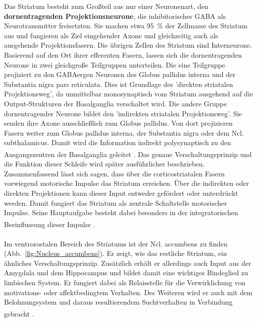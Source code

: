 \documentclass[12pt,a4paper,pdftex]{article}
\begin{document}
Das Striatum besteht zum Großteil aus nur einer Neuronenart, den \textbf{dornentragenden Projektionsneurone}, die inhibitorisches GABA als Neurotransmitter freisetzten. Sie machen etwa 95~\% der Zellmasse des Striatum aus und fungieren als Ziel eingehender Axone und gleichzeitig auch als ausgehende Projektionsfasern. Die übrigen Zellen des Striatum sind Interneurone. Basierend auf den Ort ihrer efferenten Fasern, lassen sich die dornentragenden Neurone in zwei gleichgroße Teilgruppen unterteilen. Die eine Teilgruppe projiziert zu den GABAergen Neuronen des Globus pallidus interna und der Substantia nigra pars reticulata. Dies ist Grundlage des 'direkten striatalen Projektionsweg', da unmittelbar monosynaptisch vom Striatum ausgehend auf die Output-Strukturen der Basalganglia verschaltet wird. Die andere Gruppe dornentragender Neurone bildet den 'indirekten striatalen Projektionsweg'. Sie senden ihre Axone ausschließlich zum Globus pallidus. Von dort projizieren Fasern weiter zum Globus pallidus interna, der Substantia nigra oder dem Ncl. subthalamicus. Damit wird die Information indirekt polysynaptisch zu den Ausgangszentren der Basalganglia geleitet \textsuperscript{\cite[17]{paxinos2014rat}}. Das genaue Verschaltungsprinzip und die Funktion dieser Schleife wird später ausführlicher beschrieben. Zusammenfassend lässt sich sagen, dass über die corticostriatalen Fasern vorwiegend motorische Impulse das Striatum erreichen. Über die indirekten oder direkten Projektionen kann dieser Input entweder gefördert oder unterdrückt werden. Damit fungiert das Striatum als zentrale Schaltstelle motorischer Impulse. Seine Hauptaufgabe besteht dabei besonders in der integratorischen Beeinflussung dieser Impulse \textsuperscript{\cite[9]{trepel2011neuroanatomie}}.\\  
\\ \noindent Im ventrorostalen Bereich des Striatums ist der Ncl. accumbens zu finden (Abb.~\ref{fig:Nucleus_accumbens}). Er zeigt, wie das restliche Striatum, ein ähnliches Verschaltungsprinzip. Zusätzlich erhält er allerdings auch Input aus der Amygdala und dem Hippocampus und bildet damit eine wichtiges Bindeglied zu limbischen System. Er fungiert dabei als Relaisstelle für die Verwirklichung von motivations- oder affektbedingtem Verhalten. Des Weiteren wird er auch mit dem Belohnungsystem und daraus resultierendem Suchtverhalten in Verbindung gebracht \textsuperscript{\cite[14]{crossman2014neuroanatomy}}.  
\end{document}
